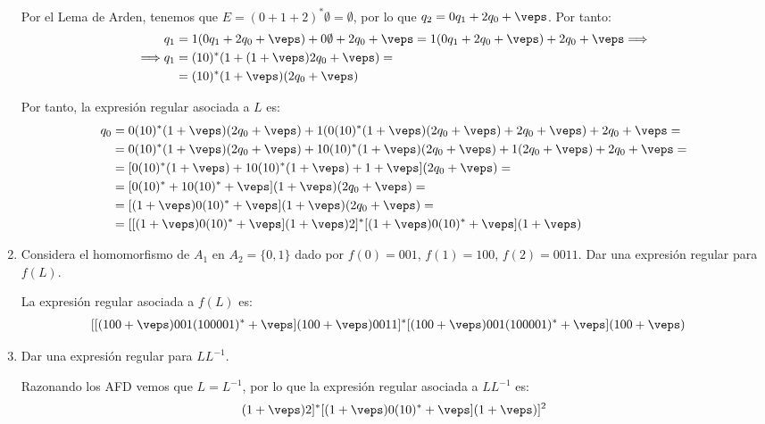 \begin{ejercicio}
\begin{enumerate}
        Por el Lema de Arden, tenemos que $E=(0+1+2)^{\ast}\emptyset=\emptyset$, por lo que $q_2=0q_1+2q_0+\veps$. Por tanto:
        \begin{align*}
            q_1 &= 1(0q_1+2q_0+\veps) + 0\emptyset + 2q_0+\veps
            = 1(0q_1 + 2q_0+\veps) + 2q_0+\veps
            \Longrightarrow \\
            \Longrightarrow
            q_1 &= (10)^{\ast}(1+(1+\veps)2q_0+\veps) =\\
            &= (10)^{\ast}(1+\veps)(2q_0+\veps)
        \end{align*}

        Por tanto, la expresión regular asociada a $L$ es:
        \begin{align*}
            q_0&= 0(10)^{\ast}(1+\veps)(2q_0+\veps)+1(0(10)^{\ast}(1+\veps)(2q_0+\veps)+2q_0+\veps)+2q_0+\veps
            =\\&= 0(10)^{\ast}(1+\veps)(2q_0+\veps)+ 10(10)^{\ast}(1+\veps)(2q_0+\veps)+1(2q_0+\veps)+2q_0+\veps
            =\\&= [0(10)^{\ast}(1+\veps)+ 10(10)^{\ast}(1+\veps)+1+\veps](2q_0+\veps)
            =\\&= [0(10)^{\ast}+ 10(10)^{\ast}+\veps](1+\veps)(2q_0+\veps)
            =\\&= [(1+\veps)0(10)^{\ast}+\veps](1+\veps)(2q_0+\veps)
            =\\&= [[(1+\veps)0(10)^{\ast}+\veps](1+\veps)2]^*[(1+\veps)0(10)^{\ast}+\veps](1+\veps)
        \end{align*}
        \item Considera el homomorfismo de $A_1$ en $A_2=\{0,1\}$  dado por $f(0)=001$, $f(1)=100$, $f(2)=0011$. Dar una expresión regular para $f(L)$.
        
        La expresión regular asociada a $f(L)$ es:
        \begin{align*}
            &[[(100+\veps)001(100001)^{\ast}+\veps](100+\veps)0011]^*[(100+\veps)001(100001)^{\ast}+\veps](100+\veps)
        \end{align*}
        \item Dar una expresión regular para $LL^{-1}$.
        
        Razonando los AFD vemos que $L=L^{-1}$, por lo que la expresión regular asociada a $LL^{-1}$ es:
        \begin{equation*}
            [[[(1+\veps)0(10)^{\ast}+\veps](1+\veps)2]^*[(1+\veps)0(10)^{\ast}+\veps](1+\veps)]^2
        \end{equation*}
    \end{enumerate}
\end{ejercicio}

